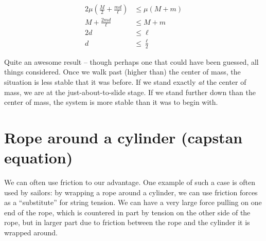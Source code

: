 \begin{align}
2 \mu \left(\frac{M}{2} + \frac{m d}{\ell}\right) &\le \mu (M + m)\\
M + \frac{2 m d}{\ell} &\le M + m\\
2 d &\le \ell\\
d &\le \frac{\ell}{2}
\end{align}

Quite an awesome result -- though perhaps one that could have been guessed, all things considered. Once we walk past (higher than) the center of mass, the situation is less stable that it was before. If we stand exactly \emph{at} the center of mass, we are at the just-about-to-slide stage. If we stand further down than the center of mass, the system is more stable than it was to begin with.

\section{Rope around a cylinder (capstan equation)}

We can often use friction to our advantage. One example of such a case is often used by sailors: by wrapping a rope around a cylinder, we can use friction forces as a ``substitute'' for string tension. We can have a very large force pulling on one end of the rope, which is countered in part by tension on the other side of the rope, but in larger part due to friction between the rope and the cylinder it is wrapped around.

